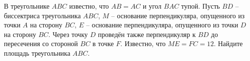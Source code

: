 \begin{ex}
	\begin{condition}
		В треугольнике \( ABC  \) известно, что \( AB=AC  \) и угол \( BAC  \) тупой. Пусть \( BD \) – биссектриса треугольника \( ABC \), \( M \) – основание перпендикуляра, опущенного из точки \( A  \) на сторону \( BC \), \( E \) – основание перпендикуляра, опущенного из точки \( D  \) на сторону \( BC \). Через точку \( D  \) проведён также перпендикуляр к \( BD  \) до пересечения со стороной \( BC  \) в точке \( F \). Известно, что \( ME=FC=12 \). Найдите площадь треугольника \( ABC \).
	\end{condition}
\end{ex}